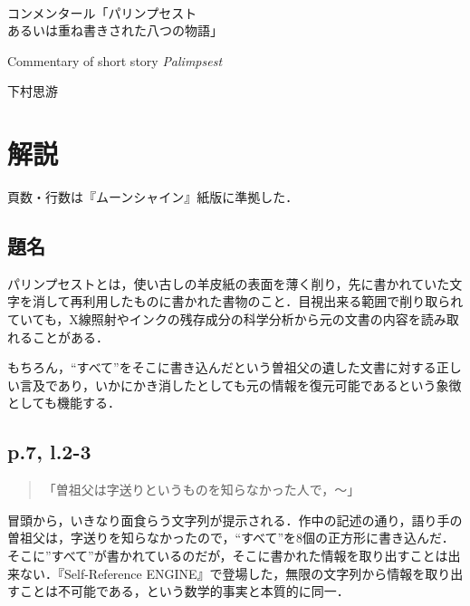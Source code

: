 \documentclass[10pt, a5paper, twoside]{jsarticle}
\theoremstyle{definition}
\begin{document}
	~ %

	\begin{center}

		\Large{コンメンタール「パリンプセスト\\あるいは重ね書きされた八つの物語」}

		\vspace{3mm}

		\large{Commentary of short story \textit{Palimpsest}}

		\vspace{3mm}
		
		\large{下村思游}

	\end{center}

	\vspace{3mm}

	\section{解説}

		頁数・行数は『ムーンシャイン』紙版\cite{moonshine}に準拠した．

		\subsection{題名}

			パリンプセストとは，使い古しの羊皮紙の表面を薄く削り，先に書かれていた文字を消して再利用したものに書かれた書物のこと．目視出来る範囲で削り取られていても，X線照射やインクの残存成分の科学分析から元の文書の内容を読み取れることがある．

			もちろん，“すべて”をそこに書き込んだという曽祖父の遺した文書に対する正しい言及であり，いかにかき消したとしても元の情報を復元可能であるという象徴としても機能する．

		\subsection{p.7, l.2-3}

			\begin{quote}

				「曽祖父は字送りというものを知らなかった人で，〜」
				
			\end{quote}

			冒頭から，いきなり面食らう文字列が提示される．作中の記述の通り，語り手の曽祖父は，字送りを知らなかったので，“すべて”を8個の正方形に書き込んだ．そこに”すべて”が書かれているのだが，そこに書かれた情報を取り出すことは出来ない．『Self-Reference ENGINE』で登場した，無限の文字列から情報を取り出すことは不可能である，という数学的事実と本質的に同一．
\end{document}

